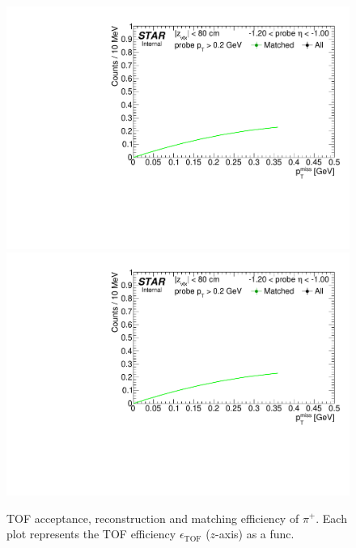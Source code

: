 \begin{figure}%
\caption[TOF acceptance, reconstruction and matching efficiency of $\pi^{+}$.]{TOF acceptance, reconstruction and matching efficiency of $\pi^{+}$. Each plot represents the TOF efficiency $\epsilon_{\text{TOF}}$ ($z$-axis) as a func.}\label{fig:tagAndProbeTofEffFits_Eta}
\centering
\parbox{0.495\textwidth}{
  \centering
  \includegraphics[width=\linewidth,page=2]{graphics/systematicsEfficiency/TOF_tagAndProbe/Fitting_effVsEta_data.pdf}\\
  \includegraphics[width=\linewidth,page=3]{graphics/systematicsEfficiency/TOF_tagAndProbe/Fitting_effVsEta_data.pdf}\\
}
\end{figure}
